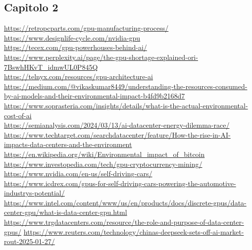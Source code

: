 \documentclass[12pt,a4paper,oneside]{book}
\begin{document}
\subsection*{Capitolo 2}
\url{https://retropcparts.com/gpu-manufacturing-process/} \\
\url{https://www.designlife-cycle.com/nvidia-gpu} \\
\url{https://tecex.com/gpu-powerhouses-behind-ai/} \\
\url{https://www.perplexity.ai/page/the-gpu-shortage-explained-ori-7BswhHKvT_idmwUL0P845Q} \\
\url{https://telnyx.com/resources/gpu-architecture-ai} \\
\url{https://medium.com/@vikaskumar8449/understanding-the-resources-consumed-by-ai-models-and-their-environmental-impact-b4fd9b2168d7} \\
\url{https://www.soprasteria.com/insights/details/what-is-the-actual-environmental-cost-of-ai} \\
\url{https://semianalysis.com/2024/03/13/ai-datacenter-energy-dilemma-race/} \\
\url{https://www.techtarget.com/searchdatacenter/feature/How-the-rise-in-AI-impacts-data-centers-and-the-environment} \\
\url{https://en.wikipedia.org/wiki/Environmental_impact_of_bitcoin} \\
\url{https://www.investopedia.com/tech/gpu-cryptocurrency-mining/} \\
\url{https://www.nvidia.com/en-us/self-driving-cars/} \\
\url{https://www.icdrex.com/gpus-for-self-driving-cars-powering-the-automotive-industrys-potential/} \\
\url{https://www.intel.com/content/www/us/en/products/docs/discrete-gpus/data-center-gpu/what-is-data-center-gpu.html} \\
\url{https://www.trgdatacenters.com/resource/the-role-and-purpose-of-data-center-gpus/}
\url{https://www.reuters.com/technology/chinas-deepseek-sets-off-ai-market-rout-2025-01-27/}
\end{document}
